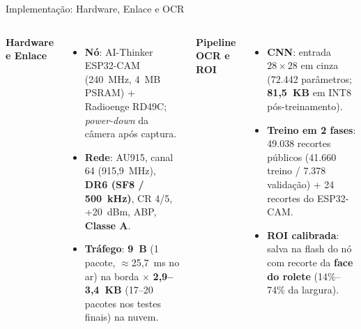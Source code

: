\documentclass[
    aspectratio=169,
    11pt,
    brazil
]{beamer}
\begin{document}
\begin{frame}{Implementação: Hardware, Enlace e OCR}
  \begin{columns}[t]
    {\footnotesize\bfseries\color{senacblue}Hardware e Enlace}
    \begin{itemize}\scriptsize
      \setlength{\itemsep}{3pt}
      \item \textbf{Nó}: AI-Thinker ESP32-CAM (240~MHz, 4~MB PSRAM) + Radioenge RD49C; \textit{power-down} da câmera após captura.
      \item \textbf{Rede}: AU915, canal 64 (915,9~MHz), \textbf{DR6 (SF8 / 500~kHz)}, CR 4/5, +20~dBm, ABP, \textbf{Classe A}.
      \item \textbf{Tráfego}: \textbf{9~B} (1 pacote, $\approx$25,7~ms no ar) na borda $\times$ \textbf{2,9--3,4~KB} (17--20 pacotes nos testes finais) na nuvem.
    \end{itemize}
    {\footnotesize\bfseries\color{senacblue}Pipeline OCR e ROI}
    \begin{itemize}\scriptsize
      \setlength{\itemsep}{3pt}
      \item \textbf{CNN}: entrada $28\times28$ em cinza (72.442 parâmetros; \textbf{81,5~KB} em INT8 pós-treinamento).
      \item \textbf{Treino em 2 fases}: 49.038 recortes públicos (41.660 treino / 7.378 validação) + 24 recortes do ESP32-CAM.
      \item \textbf{ROI calibrada}: salva na flash do nó com recorte da \textbf{face do rolete} (14\%--74\% da largura).
    \end{itemize}
  \end{columns}
\end{frame}
\end{document}
